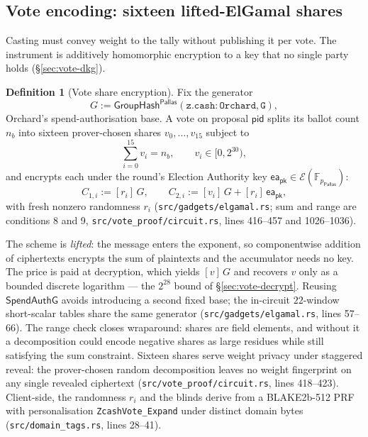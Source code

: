 \documentclass[11pt,a4paper]{article}
\theoremstyle{definition}
\newtheorem{definition}[theorem]{Definition}
\newcommand{\F}{\mathbb{F}}
\newcommand{\Pallas}{\ensuremath{\mathsf{Pallas}}}
\newcommand{\Ep}{\ensuremath{\mathcal{E}}}
\newcommand{\GroupHash}{\ensuremath{\mathsf{GroupHash}}}
\begin{document}
\subsection{Vote encoding: sixteen lifted-ElGamal shares}
\label{sec:vote-elgamal}

Casting must convey weight to the tally without publishing it per vote. The
instrument is additively homomorphic encryption to a key that no single
party holds (\S\ref{sec:vote-dkg}).

\begin{definition}[Vote share encryption]\label{def:vote-elgamal}
Fix the generator
\[
G := \GroupHash^{\Pallas}(\mathtt{z.cash:Orchard}, \mathtt{G}),
\]
Orchard's spend-authorisation base. A vote on proposal
$\mathsf{pid}$ splits its ballot count $n_b$ into sixteen prover-chosen
shares $v_0, \ldots, v_{15}$ subject to
\[
\sum_{i=0}^{15} v_i = n_b, \qquad v_i \in [0, 2^{30}),
\]
and encrypts each under the round's Election Authority key
$\mathsf{ea_{pk}} \in \Ep(\F_{p_{\Pallas}})$:
\[
C_{1,i} := [r_i]\,G, \qquad
C_{2,i} := [v_i]\,G + [r_i]\,\mathsf{ea_{pk}},
\]
with fresh nonzero randomness $r_i$
(\texttt{src/gadgets/elgamal.rs}; sum and range are conditions 8 and 9,
\texttt{src/vote\_proof/circuit.rs}, lines 416--457 and 1026--1036).
\end{definition}

The scheme is \emph{lifted}: the message enters the exponent, so
componentwise addition of ciphertexts encrypts the sum of plaintexts and the
accumulator needs no key. The price is paid at decryption, which yields
$[v]\,G$ and recovers $v$ only as a bounded discrete logarithm --- the
$2^{28}$ bound of \S\ref{sec:vote-decrypt}. Reusing $\mathsf{SpendAuthG}$
avoids introducing a second fixed base; the in-circuit $22$-window
short-scalar tables share the same generator
(\texttt{src/gadgets/elgamal.rs}, lines 57--66). The range check closes
wraparound: shares are field elements, and without it a decomposition could
encode negative shares as large residues while still satisfying the sum
constraint. Sixteen shares serve weight privacy under staggered reveal: the
prover-chosen random decomposition leaves no weight fingerprint on any
single revealed ciphertext (\texttt{src/vote\_proof/circuit.rs}, lines
418--423). Client-side, the randomness $r_i$ and the blinds derive from a
BLAKE2b-512 PRF with personalisation \texttt{ZcashVote\_Expand} under
distinct domain bytes (\texttt{src/domain\_tags.rs}, lines 28--41).
\end{document}
